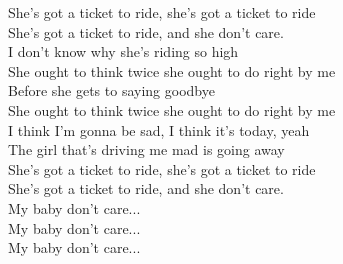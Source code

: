 \documentclass[10pt, twoside, a4paper]{article}
\begin{document}
She's got a ticket to ride, she's got a ticket to ride\\
She's got a ticket to ride, and she don't care.\\

I don't know why she's riding so high\\
She ought to think twice she ought to do right by me\\
Before she gets to saying goodbye\\
She ought to think twice she ought to do right by me\\

I think I'm gonna be sad, I think it's today, yeah\\
The girl that's driving me mad is going away  \\

She's got a ticket to ride, she's got a ticket to ride\\
She's got a ticket to ride, and she don't care.\\

My baby don't care...\\
My baby don't care...\\
My baby don't care...\\
\end{document}
